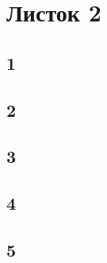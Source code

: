 \newpage
	\section{Листок 2}
		\subsection{1}
		\subsection{2}
		\subsection{3}
		\subsection{4}
		\subsection{5}